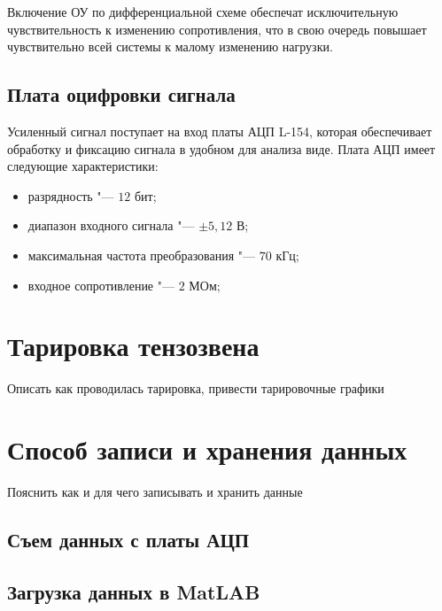 Включение ОУ по дифференциальной схеме обеспечат исключительную чувствительность к изменению сопротивления, что в свою очередь повышает чувствительно всей системы к малому изменению нагрузки.


\subsection{Плата оцифровки сигнала}\label{subsect2_3_3}

Усиленный сигнал поступает на вход платы АЦП L-154, которая обеспечивает обработку и фиксацию сигнала в удобном для анализа виде. Плата АЦП имеет следующие характеристики:
\begin{itemize}
	\item разрядность "--- $12$ бит;
	\item диапазон входного сигнала "--- $\pm5,12$ В;
	\item максимальная частота преобразования "--- $70$ кГц;
	\item входное сопротивление "--- $2$ МОм;
\end{itemize}


\section{Тарировка тензозвена}\label{sect2_4}

Описать как проводилась тарировка, привести тарировочные графики

\section{Способ записи и хранения данных}\label{sect2_5}

Пояснить как и для чего записывать и хранить данные

\subsection{Съем данных с платы АЦП}\label{subsect2_5_1}

\subsection{Загрузка данных в MatLAB}\label{subsect2_5_2}

